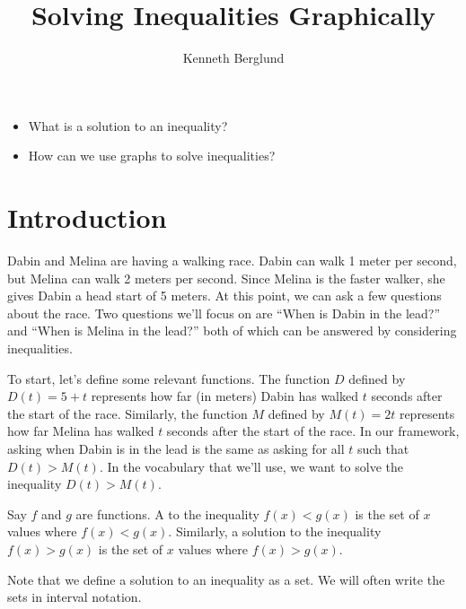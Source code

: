 \documentclass[noauthor, nooutcomes]{ximera}
\author{Kenneth Berglund}
\title{Solving Inequalities Graphically}
\begin{document}
\begin{abstract}
  
\end{abstract}
\maketitle
\licenseSZ

\begin{motivatingQuestions}\begin{itemize}
	\item What is a solution to an inequality?
	\item How can we use graphs to solve inequalities?
\end{itemize}\end{motivatingQuestions}

\section{Introduction}
Dabin and Melina are having a walking race. Dabin can walk 1 meter per second, but Melina can walk 2 meters per second. Since Melina is the faster walker, she gives Dabin a head start of 5 meters. At this point, we can ask a few questions about the race. Two questions we'll focus on are ``When is Dabin in the lead?'' and  ``When is Melina in the lead?'' both of which can be answered by considering inequalities. 

To start, let's define some relevant functions. The function $D$ defined by $D(t) = 5 + t$ represents how far (in meters) Dabin has walked $t$ seconds after the start of the race. Similarly, the function $M$ defined by $M(t) = 2t$ represents how far Melina has walked $t$ seconds after the start of the race. In our framework, asking when Dabin is in the lead is the same as asking for all $t$ such that $D(t) > M(t)$. In the vocabulary that we'll use, we want to solve the inequality $D(t) > M(t)$. 

\begin{definition}
Say $f$ and $g$ are functions. A  to the inequality $f(x) < g(x)$ is the set of $x$ values where $f(x) < g(x)$. Similarly, a solution to the inequality $f(x) > g(x)$ is the set of $x$ values where $f(x) > g(x)$.
\end{definition}

Note that we define a solution to an inequality as a set. We will often write the sets in interval notation. 
\end{document}
